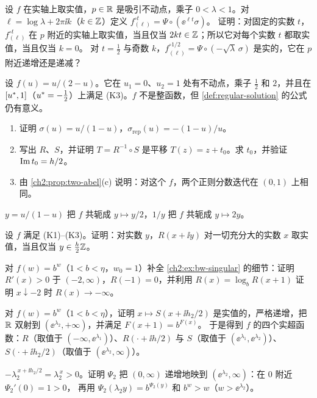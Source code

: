 \begin{exercise}\label{ch2:ex:real-branch}
设 $f$ 在实轴上取实值，$p\in\mathbb{R}$ 是吸引不动点，乘子 $0<\lambda<1$。对 $\ell=\log\lambda+2\pi\ii k$（$k\in\mathbb{Z}$）定义 $f^{\circ t}_{(\ell)}=\Psi\circ(\ee^{\ell t}\sigma)$。
证明：对固定的实数 $t$，$f_{(\ell)}^{\circ t}$ 在 $p$ 附近的实轴上取实值，当且仅当 $2kt\in\mathbb{Z}$；所以它对每个实数 $t$ 都取实值，当且仅当 $k=0$。
对 $t=\frac12$ 与奇数 $k$，$f_{(\ell)}^{\circ1/2}=\Psi\circ(-\sqrt\lambda\,\sigma)$ 是实的，它在 $p$ 附近递增还是递减？
\end{exercise}

\begin{exercise}\label{ch2:ex:mobius}
设 $f(u)=u/(2-u)$。它在 $u_1=0$、$u_2=1$ 处有不动点，乘子 $\frac12$ 和 $2$，并且在 $[u^{*},1]$（$u^{*}=-\frac12$）上满足 (K3)。$f$ 不是整函数，但 \cref{def:regular-solution} 的公式仍有意义。
\begin{enumerate}[label=(\alph*)]
\item 证明 $\sigma(u)=u/(1-u)$，$\sigma_{\mathrm{rep}}(u)=-(1-u)/u$。
\item 写出 $R$、$S$，并证明 $T=R^{-1}\circ S$ 是平移 $T(z)=z+t_0$。求 $t_0$，并验证 $\operatorname{Im} t_0=h/2$。
\item 由 \cref{ch2:prop:two-abel}(c) 说明：对这个 $f$，两个正则分数迭代在 $(0,1)$ 上相同。
\end{enumerate}
\end{exercise}
\begin{hint}
$y=u/(1-u)$ 把 $f$ 共轭成 $y\mapsto y/2$，$1/y$ 把 $f$ 共轭成 $y\mapsto 2y$。
\end{hint}

\begin{exercise}\label{ch2:ex:real-lines}
设 $f$ 满足 (K1)--(K3)。证明：对实数 $y$，$R(x+\ii y)$ 对一切充分大的实数 $x$ 取实值，当且仅当 $y\in\frac h2\mathbb{Z}$。
\end{exercise}

\begin{exercise}\label{ch2:ex:bw-domain}
对 $f(w)=b^w$（$1<b<\eta$，$w_0=1$）补全 \cref{ch2:ex:bw-singular} 的细节：证明 $R'(x)>0$ 于 $(-2,\infty)$，$R(-1)=0$，并利用 $R(x)=\log_bR(x+1)$ 证明 $x\downarrow-2$ 时 $R(x)\to-\infty$。
\end{exercise}

\begin{exercise}\label{ch2:ex:four}
对 $f(w)=b^w$（$1<b<\eta$），证明 $x\mapsto S(x+\ii h_2/2)$ 是实值的，严格递增，把 $\mathbb{R}$ 双射到 $(\ee^{\lambda_2},+\infty)$，并满足 $F(x+1)=b^{F(x)}$。
于是得到 $f$ 的四个实超函数：$R$（取值于 $(-\infty,\ee^{\lambda_1})$）、$R(\cdot+\ii h/2)$ 与 $S$（取值于 $(\ee^{\lambda_1},\ee^{\lambda_2})$）、$S(\cdot+\ii h_2/2)$（取值于 $(\ee^{\lambda_2},\infty)$）。
\end{exercise}
\begin{hint}
$-\lambda_2^{\,x+\ii h_2/2}=\lambda_2^{\,x}>0$。证明 $\Psi_2$ 把 $(0,\infty)$ 递增地映到 $(\ee^{\lambda_2},\infty)$：在 $0$ 附近 $\Psi_2'(0)=1>0$，
再用 $\Psi_2(\lambda_2y)=b^{\Psi_2(y)}$ 和 $b^w>w$（$w>\ee^{\lambda_2}$）。
\end{hint}

